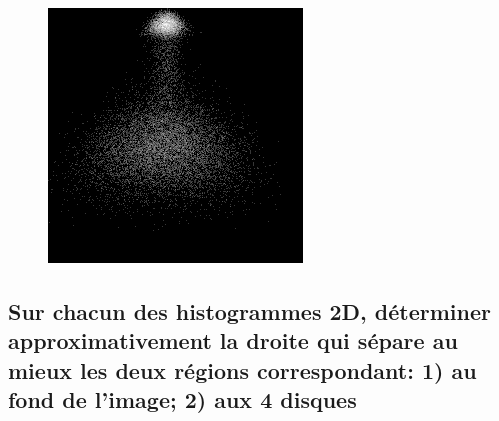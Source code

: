 \documentclass[a4paper,12pt]{report}
\begin{document}
\begin{figure}[htp]
	\includegraphics[scale=0.35]{image/hd4.png}
\end{figure}

\subsection*{Sur chacun des histogrammes 2D, déterminer approximativement la droite qui sépare au mieux les deux régions correspondant: 1) au fond de l'image; 2) aux 4 disques}
\end{document}
